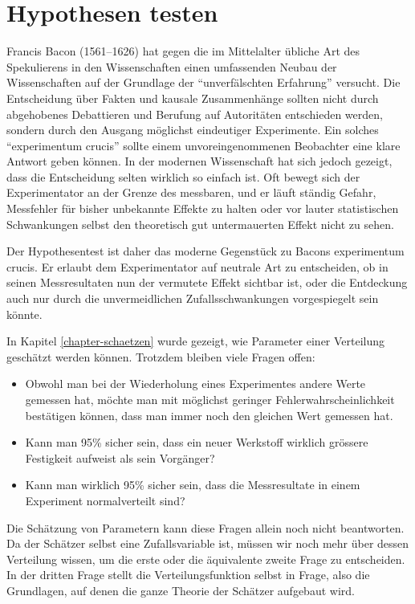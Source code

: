 %
%
%
\chapter{Hypothesen testen} \label{chapter-hypothesen-testen}
Francis Bacon (1561--1626) hat gegen die im Mittelalter übliche
Art des Spekulierens in den Wissenschaften einen umfassenden Neubau
der Wissenschaften auf der Grundlage der ``unverfälschten Erfahrung''
versucht.
Die Entscheidung über Fakten und kausale Zusammenhänge
sollten nicht durch abgehobenes Debattieren und Berufung auf 
Autoritäten entschieden werden, sondern durch den Ausgang
möglichst eindeutiger Experimente.
Ein solches ``experimentum crucis''
sollte einem unvoreingenommenen Beobachter eine klare Antwort geben
können.
In der modernen Wissenschaft hat sich jedoch gezeigt, dass
die Entscheidung selten wirklich so einfach ist.
Oft bewegt sich
der Experimentator an der Grenze des messbaren, und er läuft
ständig Gefahr, Messfehler für bisher unbekannte Effekte zu halten
oder vor lauter statistischen Schwankungen selbst den theoretisch
gut untermauerten Effekt nicht zu sehen.

Der Hypothesentest ist daher das moderne Gegenstück zu Bacons
experimentum crucis.
Er erlaubt dem Experimentator auf neutrale
Art zu entscheiden, ob in seinen Messresultaten nun der vermutete
Effekt sichtbar ist, oder die Entdeckung auch nur durch die unvermeidlichen
Zufallsschwankungen vorgespiegelt sein könnte.

In Kapitel \ref{chapter-schaetzen} wurde gezeigt, wie Parameter einer
Verteilung geschätzt werden können.
Trotzdem bleiben viele Fragen offen:
\begin{itemize}
\item Obwohl man bei der Wiederholung eines Experimentes andere Werte
gemessen hat, möchte man mit möglichst geringer Fehlerwahrscheinlichkeit
bestätigen können, dass man immer noch den gleichen Wert gemessen hat.
\item Kann man 95\% sicher sein, dass ein neuer Werkstoff wirklich grössere
Festigkeit aufweist als sein Vorgänger?
\item Kann man wirklich 95\% sicher sein, dass die Messresultate
in einem Experiment normalverteilt sind?
\end{itemize}
Die Schätzung von Parametern kann diese Fragen allein noch nicht beantworten.
Da der Schätzer selbst eine Zufallsvariable ist, müssen wir noch
mehr über dessen Verteilung wissen, um die erste oder die äquivalente
zweite Frage zu entscheiden.
In der dritten Frage stellt die
Verteilungsfunktion selbst in Frage, also die Grundlagen, auf denen
die ganze Theorie der Schätzer aufgebaut wird.

